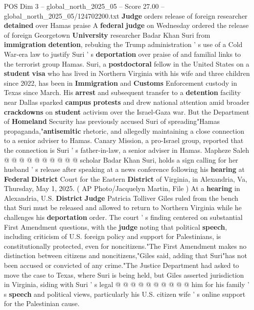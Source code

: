 \begin{textsample}{POS Dim 3 – global\_north\_2025\_05 – Score 27.00 – global\_north\_2025\_05/124702200.txt}  \label{ex:f3_pos_135}
\textbf{Judge} orders release of foreign researcher \textbf{detained} over Hamas praise A \textbf{federal} \textbf{judge} on Wednesday ordered the release of foreign Georgetown \textbf{University} researcher Badar Khan Suri from \textbf{immigration} \textbf{detention}, rebuking the Trump administration ' s use of a Cold War-era law to justify Suri ' s \textbf{deportation} over praise of and familial links to the terrorist group Hamas.
Suri, a \textbf{postdoctoral} fellow in the United States on a \textbf{student} \textbf{visa} who has lived in Northern Virginia with his wife and three children since 2022, has been in \textbf{Immigration} and \textbf{Customs} Enforcement custody in Texas since March.
His \textbf{arrest} and subsequent transfer to a \textbf{detention} facility near Dallas sparked \textbf{campus} \textbf{protests} and drew national attention amid broader \textbf{crackdowns} on \textbf{student} activism over the Israel-Gaza war.
But the Department of \textbf{Homeland} Security has previously accused Suri of spreading"Hamas propaganda,"\textbf{antisemitic} rhetoric, and allegedly maintaining a close connection to a senior adviser to Hamas.
Canary Mission, a pro-Israel group, reported that the connection is Suri ' s father-in-law, a senior adviser in Hamas.
Mapheze Saleh @ @ @ @ @ @ @ @ @ @ scholar Badar Khan Suri, holds a sign calling for her husband ' s release after speaking at a news conference following his \textbf{hearing} at \textbf{Federal} \textbf{District} Court for the Eastern \textbf{District} of Virginia, in Alexandria, Va, Thursday, May 1, 2025. ( AP Photo/Jacquelyn Martin, File ) At a \textbf{hearing} in Alexandria, U.S. \textbf{District} \textbf{Judge} Patricia Tolliver Giles ruled from the bench that Suri must be released and allowed to return to Northern Virginia while he challenges his \textbf{deportation} order.
The court ' s finding centered on substantial First Amendment questions, with the \textbf{judge} noting that political \textbf{speech}, including criticism of U.S. foreign policy and support for Palestinians, is constitutionally protected, even for noncitizens."The First Amendment makes no distinction between citizens and noncitizens,"Giles said, adding that Suri"has not been accused or convicted of any crime."The Justice Department had asked to move the case to Texas, where Suri is being held, but Giles asserted jurisdiction in Virginia, siding with Suri ' s legal @ @ @ @ @ @ @ @ @ @ him for his family ' s \textbf{speech} and political views, particularly his U.S. citizen wife ' s online support for the Palestinian cause.

\end{textsample}
